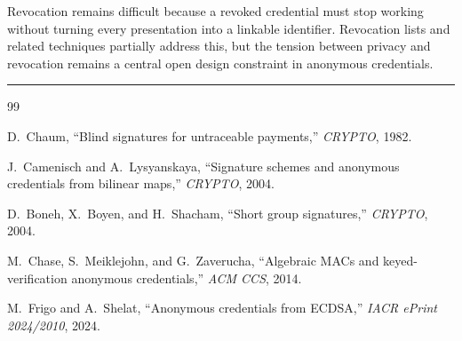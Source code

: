 \documentclass[11pt]{article}
\begin{document}
Revocation remains difficult because a revoked credential must stop working
without turning every presentation into a linkable identifier.  Revocation
lists and related techniques partially address this, but the tension between
privacy and revocation remains a central open design constraint in anonymous
credentials.

\bigskip
\hrule
\bigskip

\begin{thebibliography}{99}

  D.~Chaum,
  ``Blind signatures for untraceable payments,''
  \emph{CRYPTO}, 1982.

  J.~Camenisch and A.~Lysyanskaya,
  ``Signature schemes and anonymous credentials from bilinear maps,''
  \emph{CRYPTO}, 2004.

  D.~Boneh, X.~Boyen, and H.~Shacham,
  ``Short group signatures,''
  \emph{CRYPTO}, 2004.

  M.~Chase, S.~Meiklejohn, and G.~Zaverucha,
  ``Algebraic MACs and keyed-verification anonymous credentials,''
  \emph{ACM CCS}, 2014.

  M.~Frigo and A.~Shelat,
  ``Anonymous credentials from ECDSA,''
  \emph{IACR ePrint 2024/2010}, 2024.

\end{thebibliography}
\end{document}
